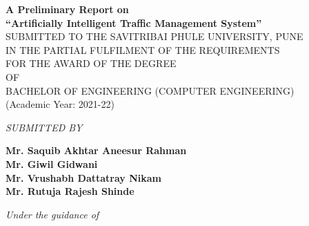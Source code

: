 \documentclass[openany,12pt]{report}
\begin{document}
	\lhead{}
	\chead{}
	\setlength{\headrulewidth}{0.4pt}
	\setlength{\footrulewidth}{0.4pt}
	\fontsize{12}{15}
	\begin{titlepage}
		\begin{center}
			{\bf A Preliminary Report on} \\
			\vspace{0.3in}
			{\Large \bf ``Artificially Intelligent Traffic Management System''}\\
			\vspace{0.3in}
			SUBMITTED TO THE SAVITRIBAI PHULE UNIVERSITY, PUNE\\
			IN THE PARTIAL FULFILMENT OF THE REQUIREMENTS \\
			FOR THE AWARD OF THE DEGREE \\
			\vspace{0.2in}
			OF\\  
			\vspace{0.2in}
			BACHELOR OF ENGINEERING (COMPUTER ENGINEERING)\\
			(Academic Year: 2021-22)\\
			\vspace{0.2in}
			
			{\it SUBMITTED BY}\\
			
			\vspace{0.2in}
			
			{\bf Mr. Saquib Akhtar Aneesur Rahman}\\
			{\bf Mr. Giwil Gidwani }\\
			{\bf Mr. Vrushabh Dattatray Nikam     }\\
			{\bf Mr. Rutuja Rajesh Shinde    }\\
			
			\vspace{0.4in}
			
			{\it Under the guidance of}\\
			

\end{center}
\end{titlepage}
\end{document}
